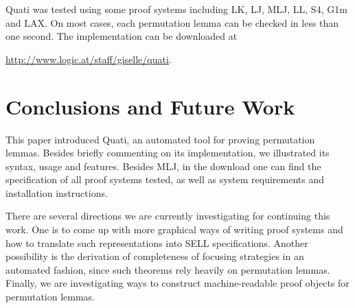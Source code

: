 \documentclass{llncs}
\begin{document}
Quati was tested using some proof systems including LK, LJ, MLJ, LL, S4, G1m and
LAX. On
most cases, each permutation lemma can be checked in less than one second. The
implementation can be downloaded at
\begin{center}
\url{http://www.logic.at/staff/giselle/quati}. 
\end{center}

\vspace{-2mm}

\section{Conclusions and Future Work}
\label{sec:conc}
This paper introduced Quati, an automated tool for proving permutation lemmas. Besides briefly 
commenting on its implementation, we illustrated its syntax, usage and features. Besides MLJ, in the download
one can find the specification of all proof systems tested, as well as system
requirements and installation instructions.

There are several directions we are currently investigating for continuing this work. One is to come up with 
more graphical ways of writing proof systems and how to translate such representations into SELL specifications. 
Another possibility is the derivation of completeness of focusing
strategies in an automated fashion, since such theorems rely heavily on
permutation lemmas.
Finally, we are investigating ways to construct machine-readable proof objects for permutation lemmas.

\vspace{-2mm}
\end{document}
